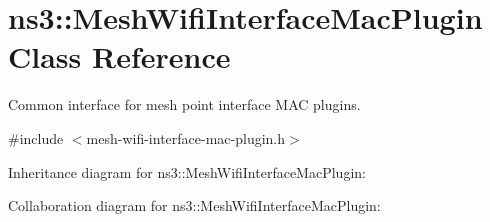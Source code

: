 \hypertarget{classns3_1_1MeshWifiInterfaceMacPlugin}{}\section{ns3\+:\+:Mesh\+Wifi\+Interface\+Mac\+Plugin Class Reference}
\label{classns3_1_1MeshWifiInterfaceMacPlugin}


Common interface for mesh point interface M\+AC plugins.  




{\ttfamily \#include $<$mesh-\/wifi-\/interface-\/mac-\/plugin.\+h$>$}



Inheritance diagram for ns3\+:\+:Mesh\+Wifi\+Interface\+Mac\+Plugin\+:


Collaboration diagram for ns3\+:\+:Mesh\+Wifi\+Interface\+Mac\+Plugin\+:
